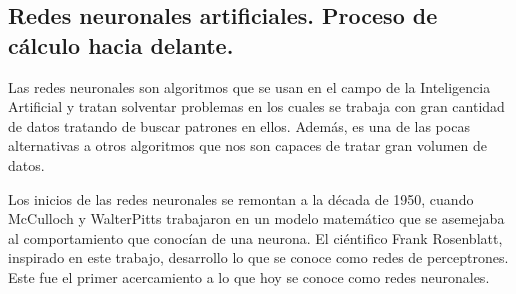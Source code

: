 \subsection{Redes neuronales artificiales. Proceso de cálculo hacia delante.}

Las redes neuronales son algoritmos que se usan en el campo de la Inteligencia Artificial y tratan solventar problemas en los cuales se trabaja con gran cantidad de datos tratando de buscar patrones en ellos. Además, es una de las pocas alternativas a otros algoritmos que nos son capaces de tratar gran volumen de datos. 
\newline

Los inicios de las redes neuronales se remontan a la década de 1950, cuando McCulloch y WalterPitts\cite{kleene} trabajaron en un modelo matemático que se asemejaba al comportamiento que conocían de una neurona. El ciéntifico Frank Rosenblatt, inspirado en este trabajo, desarrollo lo que se conoce como redes de perceptrones. Este fue el primer acercamiento a lo que hoy se conoce como redes neuronales\cite{nielsen}. 






